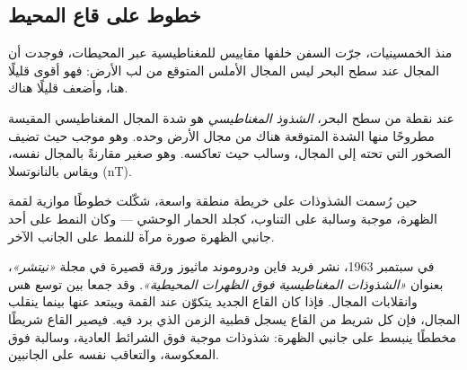 \subsection{خطوط على قاع المحيط}

منذ الخمسينيات، جرّت السفن خلفها مقاييس للمغناطيسية عبر المحيطات،
فوجدت أن المجال عند سطح البحر ليس المجال الأملس المتوقع من
لب الأرض: فهو أقوى قليلًا هنا، وأضعف قليلًا هناك.

\begin{definition}\label{def:g11:drift-to-spreading:anomaly}
عند نقطة من سطح البحر،
\emph{الشذوذ المغناطيسي} هو شدة المجال المغناطيسي المقيسة مطروحًا منها الشدة
المتوقعة هناك من مجال الأرض وحده. وهو موجب حيث تضيف الصخور
التي تحته إلى المجال، وسالب حيث تعاكسه. وهو صغير مقارنةً
بالمجال نفسه، ويقاس بالنانوتسلا (\unit{nT}).
\end{definition}

حين رُسمت الشذوذات على خريطة منطقة واسعة، شكّلت خطوطًا موازية لقمة
الظهرة، موجبة وسالبة على التناوب، كجلد الحمار الوحشي --- وكان النمط
على أحد جانبي الظهرة صورة مرآة للنمط على الجانب الآخر.

\begin{history}
في سبتمبر 1963، نشر فريد فاين ودروموند ماثيوز ورقة قصيرة في مجلة \emph{«نيتشر»}،
بعنوان \emph{«الشذوذات المغناطيسية فوق الظهرات المحيطية»}. وقد جمعا بين توسع هس
وانقلابات المجال. فإذا كان القاع الجديد يتكوّن عند القمة ويبتعد
عنها بينما ينقلب المجال، فإن كل شريط من القاع يسجل قطبية
الزمن الذي برد فيه. فيصير القاع شريطًا مخططًا ينبسط على جانبي
الظهرة: شذوذات موجبة فوق الشرائط العادية، وسالبة فوق
المعكوسة، والتعاقب نفسه على الجانبين.
\end{history}

